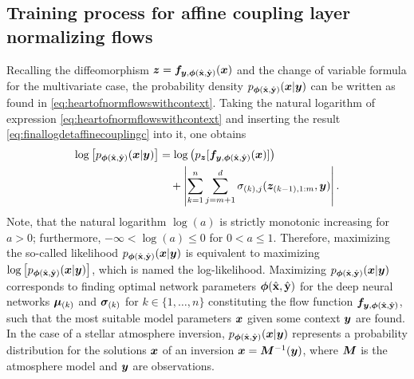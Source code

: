 \documentclass[a4paper,11pt]{report}
\begin{document}
\subsection{Training process for affine coupling layer normalizing flows}
Recalling the diffeomorphism $\bm{z} = \bm{f}_{\bm{y},\bm{\phi}(\hat{\boldsymbol{\mathbf{x}}},\hat{\boldsymbol{\mathbf{y}}})}(\bm{x})$ and the change of variable formula for the multivariate case, the probability density $p_{\bm{\phi}(\hat{\boldsymbol{\mathbf{x}}},\hat{\boldsymbol{\mathbf{y}}})}(\bm{x}|\bm{y})$ can be written as found in \cref{eq:heartofnormflowswithcontext}. Taking the natural logarithm of expression \cref{eq:heartofnormflowswithcontext} and inserting the result \cref{eq:finallogdetaffinecouplingc} into it, one obtains
\begin{align}\begin{aligned}
\log\left[p_{\bm{\phi}(\hat{\boldsymbol{\mathbf{x}}},\hat{\boldsymbol{\mathbf{y}}})}(\bm{x}|\bm{y})\right] &= \log\left(p_{\bm{z}}[\bm{f}_{\bm{y},\bm{\phi}(\hat{\boldsymbol{\mathbf{x}}},\hat{\boldsymbol{\mathbf{y}}})}(\bm{x})]\right) \\ &\quad + \left|\sum_{k = 1}^{n}\sum_{j = m+1}^{d}\sigma_{(k),j}(\bm{z}_{(k-1),1:m},\bm{y})\right|.
\end{aligned}\end{align} Note, that the natural logarithm $\log(a)$ is strictly monotonic increasing for $a > 0$; furthermore, $-\infty < \log(a) \leq 0$ for $ 0 < a \leq 1$. Therefore, maximizing the so-called likelihood $p_{\bm{\phi}(\hat{\boldsymbol{\mathbf{x}}},\hat{\boldsymbol{\mathbf{y}}})}(\bm{x}|\bm{y})$ is equivalent to maximizing $\log\left[p_{\bm{\phi}(\hat{\boldsymbol{\mathbf{x}}},\hat{\boldsymbol{\mathbf{y}}})}(\bm{x}|\bm{y})\right]$, which is named the log-likelihood. Maximizing $p_{\bm{\phi}(\hat{\boldsymbol{\mathbf{x}}},\hat{\boldsymbol{\mathbf{y}}})}(\bm{x}|\bm{y})$ corresponds to finding optimal network parameters $\bm{\phi}(\hat{\boldsymbol{\mathbf{x}}},\hat{\boldsymbol{\mathbf{y}}})$ for the deep neural networks $\bm{\mu}_{(k)}$ and $\bm{\sigma}_{(k)}$ for $k \in\{1,\dots,n\}$ constituting the flow function $\bm{f}_{\bm{y},\bm{\phi}(\hat{\boldsymbol{\mathbf{x}}},\hat{\boldsymbol{\mathbf{y}}})}$, such that the most suitable model parameters $\bm{x}$ given some context $\bm{y}$ are found. In the case of a stellar atmosphere inversion, $p_{\bm{\phi}(\hat{\boldsymbol{\mathbf{x}}},\hat{\boldsymbol{\mathbf{y}}})}(\bm{x}|\bm{y})$ represents a probability distribution for the solutions $\bm{x}$ of an inversion $\bm{x} = \bm{M}^{-1}(\bm{y})$, where $\bm{M}$ is the atmosphere model and $\bm{y}$ are observations.
\end{document}
